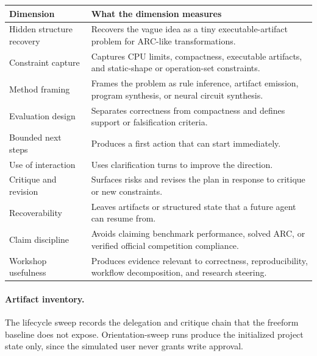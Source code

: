 \begin{center}
  \scriptsize
  \setlength{\tabcolsep}{4pt}
  \begin{tabular}{@{}p{}p{}@{}}
    \toprule
    Dimension & What the dimension measures \\
    \midrule
    Hidden structure recovery & Recovers the vague idea as a tiny executable-artifact problem for ARC-like transformations. \\
    Constraint capture & Captures CPU limits, compactness, executable artifacts, and static-shape or operation-set constraints. \\
    Method framing & Frames the problem as rule inference, artifact emission, program synthesis, or neural circuit synthesis. \\
    Evaluation design & Separates correctness from compactness and defines support or falsification criteria. \\
    Bounded next steps & Produces a first action that can start immediately. \\
    Use of interaction & Uses clarification turns to improve the direction. \\
    Critique and revision & Surfaces risks and revises the plan in response to critique or new constraints. \\
    Recoverability & Leaves artifacts or structured state that a future agent can resume from. \\
    Claim discipline & Avoids claiming benchmark performance, solved ARC, or verified official competition compliance. \\
    Workshop usefulness & Produces evidence relevant to correctness, reproducibility, workflow decomposition, and research steering. \\
    \bottomrule
  \end{tabular}
\end{center}

\paragraph{Artifact inventory.}
The lifecycle sweep records the delegation and critique chain that the freeform baseline does not expose. Orientation-sweep runs produce the initialized project state only, since the simulated user never grants write approval.


